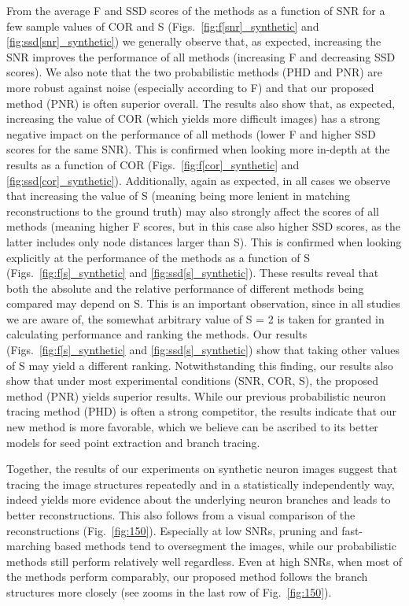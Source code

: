 From the average F and SSD scores of the methods as a function of SNR for a few sample values of COR and S (Figs.~\ref{fig:f[snr]_synthetic} and \ref{fig:ssd[snr]_synthetic}) we generally observe that, as expected, increasing the SNR improves the performance of all methods (increasing F and decreasing SSD scores). We also note that the two probabilistic methods (PHD and PNR) are more robust against noise (especially according to F) and that our proposed method (PNR) is often superior overall. The results also show that, as expected, increasing the value of COR (which yields more difficult images) has a strong negative impact on the performance of all methods (lower F and higher SSD scores for the same SNR). This is confirmed when looking more in-depth at the results as a function of COR (Figs.~\ref{fig:f[cor]_synthetic} and \ref{fig:ssd[cor]_synthetic}). Additionally, again as expected, in all cases we observe that increasing the value of S (meaning being more lenient in matching reconstructions to the ground truth) may also strongly affect the scores of all methods (meaning higher F scores, but in this case also higher SSD scores, as the latter includes only node distances larger than S). This is confirmed when looking explicitly at the performance of the methods as a function of S (Figs.~\ref{fig:f[s]_synthetic} and \ref{fig:ssd[s]_synthetic}). These results reveal that both the absolute and the relative performance of different methods being compared may depend on S. This is an important observation, since in all studies we are aware of, the somewhat arbitrary value of S = 2 is taken for granted in calculating performance and ranking the methods. Our results (Figs.~\ref{fig:f[s]_synthetic} and \ref{fig:ssd[s]_synthetic}) show that taking other values of S may yield a different ranking. Notwithstanding this finding, our results also show that under most experimental conditions (SNR, COR, S), the proposed method (PNR) yields superior results. While our previous probabilistic neuron tracing method (PHD) \citep{radojevic2017automated} is often a strong competitor, the results indicate that our new method is more favorable, which we believe can be ascribed to its better models for seed point extraction and branch tracing.

Together, the results of our experiments on synthetic neuron images suggest that tracing the image structures repeatedly and in a statistically independently way, indeed yields more evidence about the underlying neuron branches and leads to better reconstructions. This also follows from a visual comparison of the reconstructions (Fig.~\ref{fig:150}). Especially at low SNRs, pruning and fast-marching based methods tend to oversegment the images, while our probabilistic methods still perform relatively well regardless. Even at high SNRs, when most of the methods perform comparably, our proposed method follows the branch structures more closely (see zooms in the last row of Fig.~\ref{fig:150}).

